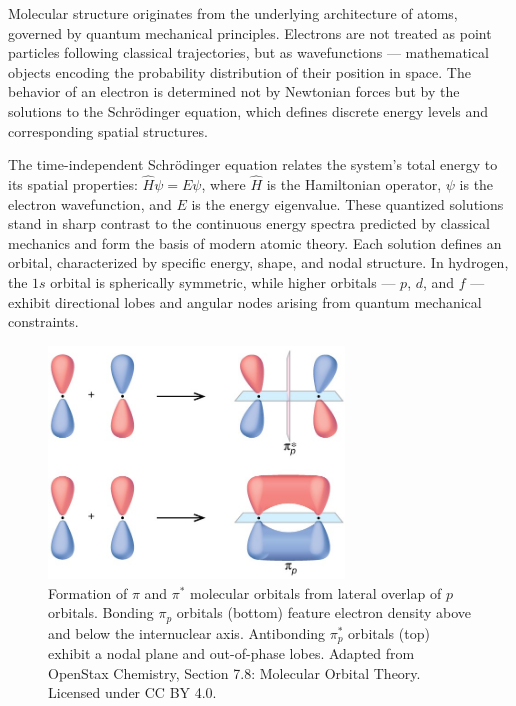Molecular structure originates from the underlying architecture of atoms, governed by quantum mechanical principles. Electrons are not treated as point particles following classical trajectories, but as wavefunctions — mathematical objects encoding the probability distribution of their position in space. The behavior of an electron is determined not by Newtonian forces but by the solutions to the Schrödinger equation, which defines discrete energy levels and corresponding spatial structures.

The time-independent Schrödinger equation relates the system's total energy to its spatial properties: $\hat{H}\psi = E\psi$, where $\hat{H}$ is the Hamiltonian operator, $\psi$ is the electron wavefunction, and $E$ is the energy eigenvalue. These quantized solutions stand in sharp contrast to the continuous energy spectra predicted by classical mechanics and form the basis of modern atomic theory. Each solution defines an orbital, characterized by specific energy, shape, and nodal structure. In hydrogen, the $1s$ orbital is spherically symmetric, while higher orbitals — $p$, $d$, and $f$ — exhibit directional lobes and angular nodes arising from quantum mechanical constraints.


\begin{figure}[H]
\centering
\includegraphics[width=0.7\textwidth]{46_WoodwardHoffmannRules/CNX_Chem_08_04_pMOpi1.jpg}
\caption{Formation of $\pi$ and $\pi^*$ molecular orbitals from lateral overlap of $p$ orbitals. Bonding $\pi_p$ orbitals (bottom) feature electron density above and below the internuclear axis. Antibonding $\pi_p^*$ orbitals (top) exhibit a nodal plane and out-of-phase lobes. Adapted from OpenStax Chemistry, Section 7.8: Molecular Orbital Theory. Licensed under CC BY 4.0.}
\label{fig:pi_p}
\end{figure}


